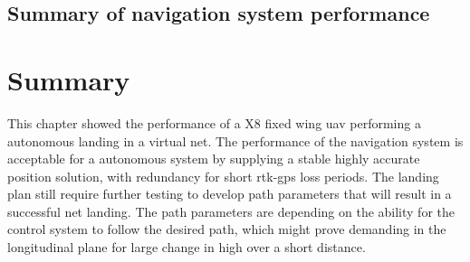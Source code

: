 \subsection{Summary of navigation system performance}
\section{Summary}
This chapter showed the performance of a X8 fixed wing \gls{uav} performing a autonomous landing in a virtual net. The performance of the navigation system is acceptable for a autonomous system by supplying a stable highly accurate position solution, with redundancy for short \gls{rtk-gps} loss periods. The landing plan still require further testing to develop path parameters that  will result in a successful net landing. The path parameters are depending on the ability for the control system to follow the desired path, which might prove demanding in the longitudinal plane for large change in high over a short distance.